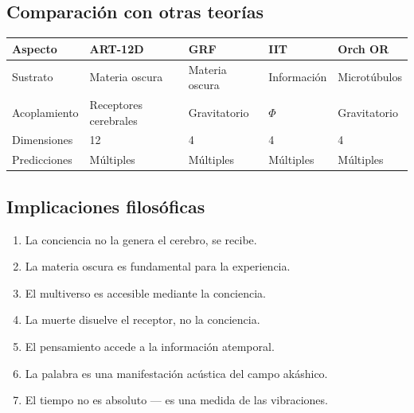 \documentclass[11pt,a4paper]{article}
\begin{document}
\subsection{Comparación con otras teorías}
\begin{table}[H]
\centering
\begin{tabular}{@{}lllll@{}}
\toprule
\textbf{Aspecto} & \textbf{ART-12D} & \textbf{GRF} & \textbf{IIT} & \textbf{Orch OR} \\ \midrule
Sustrato & Materia oscura & Materia oscura & Información & Microtúbulos \\
Acoplamiento & Receptores cerebrales & Gravitatorio & $\Phi$ & Gravitatorio \\
Dimensiones & 12 & 4 & 4 & 4 \\
Predicciones & Múltiples & Múltiples & Múltiples & Múltiples \\ \bottomrule
\end{tabular}
\end{table}

\subsection{Implicaciones filosóficas}
\begin{enumerate}
    \item La conciencia no la genera el cerebro, se recibe.
    \item La materia oscura es fundamental para la experiencia.
    \item El multiverso es accesible mediante la conciencia.
    \item La muerte disuelve el receptor, no la conciencia.
    \item El pensamiento accede a la información atemporal.
    \item La palabra es una manifestación acústica del campo akáshico.
    \item El tiempo no es absoluto --- es una medida de las vibraciones.
\end{enumerate}
\end{document}
